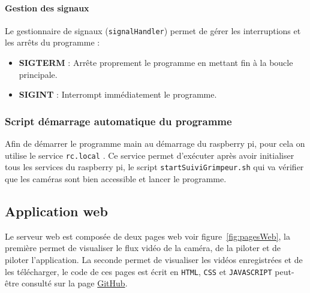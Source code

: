 \documentclass[a4paper, 11pt, french]{article}
\begin{document}
\paragraph{Gestion des signaux}
Le gestionnaire de signaux (\texttt{signalHandler}) permet de gérer les interruptions et les arrêts du programme :
\begin{itemize}
    \item \textbf{SIGTERM} : Arrête proprement le programme en mettant fin à la boucle principale.
    \item \textbf{SIGINT} : Interrompt immédiatement le programme.
\end{itemize}

\subsubsection{Script démarrage automatique du programme}

Afin de démarrer le programme main au démarrage du raspberry pi, pour cela on utilise le service \texttt{rc.local} \cite{rcLocal}. Ce service permet d'exécuter après avoir initialiser tous les services du raspberry pi, le script \texttt{startSuiviGrimpeur.sh} qui va vérifier que les caméras sont bien accessible et lancer le programme. 

\subsection{Application web}
Le serveur web est composée de deux pages web voir figure~\ref{fig:pagesWeb}, la première permet de visualiser le flux vidéo de la caméra, de la piloter et de piloter l'application. La seconde permet de visualiser les vidéos enregistrées et de les télécharger, le code de ces pages est écrit en \texttt{HTML}, \texttt{CSS} et \texttt{JAVASCRIPT} peut-être consulté sur la page \href{https://github.com/Romaiiin91/suiviGrimpeur_PDI/tree/main/server/html}{GitHub}.
\end{document}
